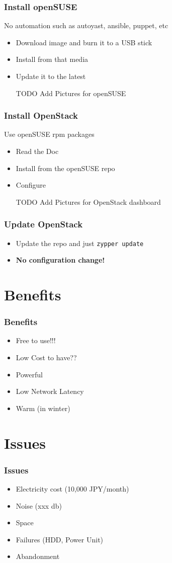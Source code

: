 \documentclass[aspectratio=169,11pt,hyperref={colorlinks=true}]{beamer}
\begin{document}
\begin{frame}
  \frametitle{Install openSUSE}
  No automation such as autoyast, ansible, puppet, etc
  \begin{itemize}
    \item Download image and burn it to a USB stick
    \item Install from that media
    \item Update it to the latest
    \item [TODO] Add Pictures for openSUSE
  \end{itemize}
\end{frame}

\begin{frame}
  \frametitle{Install OpenStack}
  Use openSUSE rpm packages
  \begin{itemize}
    \item Read the Doc
    \item Install from the openSUSE repo
    \item Configure
    \item [TODO] Add Pictures for OpenStack dashboard
  \end{itemize}
\end{frame}

\begin{frame}
  \frametitle{Update OpenStack}
  \begin{itemize}
    \item Update the repo and just \texttt{zypper update}
    \item \bf{No configuration change!}
  \end{itemize}
\end{frame}

\section{Benefits}
\begin{frame}
  \frametitle{Benefits}
  \begin{itemize}
    \item Free to use!!!
    \item Low Cost to have??
    \item Powerful
    \item Low Network Latency
    \item Warm (in winter)
  \end{itemize}
\end{frame}

\section{Issues}
\begin{frame}
  \frametitle{Issues}
  \begin{itemize}
    \item Electricity cost (10,000 JPY/month)
    \item Noise (xxx db)
    \item Space
    \item Failures (HDD, Power Unit)
    \item Abandonment
  \end{itemize}
\end{frame}
\end{document}
